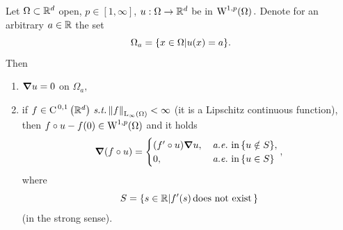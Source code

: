 \documentclass{article}
\begin{document}
\begin{theorem}
	Let $\Omega \subset {\mathbb R}^{d}$ open, $p \in [1, \infty]$, $u: \Omega \to {\mathbb R}^{d}$ be in $\WkpSet[1][p]{\Omega}.$ Denote for an arbitrary $a \in {\mathbb R}$ the set
	\[
		\Omega_a = \qty{x \in \Omega | u(x) = a}.
	\]
	Then 
	\begin{enumerate}
		\item $\grad u = 0$ on $\Omega_a,$ 
		\item if $f \in \text{C}^{\!\, \,0,1}\!\,\left({\mathbb R}^{d} \right) \, \text{\textit{s.t.}} \, \norm{f}_{\text{L}_{\infty}\!\,\left(\Omega \right)} < \infty$ (it is a Lipschitz continuous function), then $f \circ u - f(0) \in \WkpSet[1][p]{\Omega}$ and it holds
			\[
				\grad \qty(f \circ u) = \begin{cases}
					\qty(f' \circ u)\grad u, & \, \text{\textit{a.e.}} \,\, \text{in} \, \qty{u \notin S},\\
					0, & \, \text{\textit{a.e.}} \, \, \text{in} \, \qty{u \in S}
				\end{cases},
			\]
			where 
			\[
				S = \qty{s \in \ensuremath{{\mathbb R}}| f'(s) \, \text{does not exist} \,}
			\]
			(in the strong sense).
	\end{enumerate}
\end{theorem}
\end{document}

